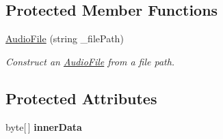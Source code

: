 \subsection*{Protected Member Functions}
\begin{DoxyCompactItemize}
\item 
\hyperlink{class_stegosaurus_1_1_carrier_1_1_audio_formats_1_1_audio_file_ad64ea28a0bf30b61f69174c094a9539c}{Audio\+File} (string \+\_\+file\+Path)
\begin{DoxyCompactList}\small\item\em Construct an \hyperlink{class_stegosaurus_1_1_carrier_1_1_audio_formats_1_1_audio_file}{Audio\+File} from a file path. \end{DoxyCompactList}\end{DoxyCompactItemize}
\subsection*{Protected Attributes}
\begin{DoxyCompactItemize}
\item 
byte\mbox{[}$\,$\mbox{]} {\bfseries inner\+Data}\hypertarget{class_stegosaurus_1_1_carrier_1_1_audio_formats_1_1_audio_file_ab2ed9d7628f413b6930d4e16bfe54c1e}{}\label{class_stegosaurus_1_1_carrier_1_1_audio_formats_1_1_audio_file_ab2ed9d7628f413b6930d4e16bfe54c1e}

\end{DoxyCompactItemize}
